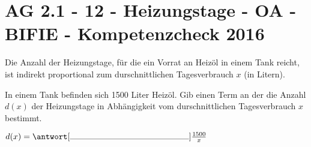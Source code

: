\section{AG 2.1 - 12 - Heizungstage - OA - BIFIE - Kompetenzcheck 2016}

\begin{beispiel}[AG 2.1]{1} %
				Die Anzahl der Heizungstage, für die ein Vorrat an Heizöl in einem Tank reicht, ist indirekt proportional zum durschnittlichen Tagesverbrauch $x$ (in Litern).

In einem Tank befinden sich 1500 Liter Heizöl. Gib einen Term an der die Anzahl $d(x)$ der Heizungstage in Abhängigkeit vom durschnittlichen Tagesverbrauch $x$ bestimmt.\leer

$d(x)=\antwort[\rule{5cm}{0.3pt}]{\frac{1500}{x}}$
\end{beispiel}	